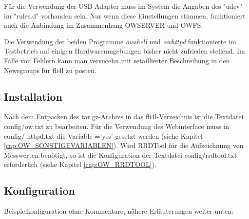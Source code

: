 Für die Verwendung der USB-Adapter muss im System die Angaben des "udev" im "rules.d"
vorhanden sein. Nur wenn diese Einstellungen stimmen, funktioniert auch die Anbindung
im Zusammenhang OWSERVER und OWFS.

Die Verwendung der beiden Programme \emph{owshell} und \emph{owhttpd} funktionierte im Testbetrieb
auf einigen Hardwareumgebungen bisher nicht zufrieden stellend. Im Falle von Fehlern
kann man versucehn mit setaillierter Beschreibung in den Newsgroups für fli4l zu posten.

\subsection{Installation}
Nach dem Entpacken des tar.gz-Archivs in das fli4l-Verzeichnis ist die Textdatei
config/ow.txt zu bearbeiten. Für die Verwendung des Webinterface muss in config/
httpd.txt die Variable ='yes' gesetzt werden (siehe Kapitel
\ref{cap:OW_SONSTIGEVARIABLEN}). Wird
RRDTool für die Aufzeichnung von Messwerten benötigt, so ist die Konfiguration der
Textdatei config/rrdtool.txt erforderlich (siehe Kapitel \ref{cap:OW_RRDTOOL}).

\subsection{Konfiguration}
Beispielkonfiguration ohne Kommentare, nähere Erläuterungen weiter unten:

